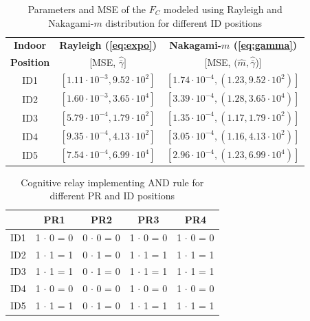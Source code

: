 \begin{table}
\renewcommand{\arraystretch}{1.3}
\caption{Parameters and MSE of the $F_{C}$ modeled using Rayleigh and Nakagami-$m$ distribution for different ID positions}
\label{tb:MSE_IO}
\centering
\begin{tabular}{c||c|c}
\hline
\bfseries Indoor & \bfseries Rayleigh (\ref{eq:expo}) & \bfseries Nakagami-$m$ (\ref{eq:gamma}) \\
\bfseries Position & [MSE, $\widehat{\bar{\gamma}}]$ & [MSE, $(\widehat{m}, \widehat{\bar{\gamma}}$)] \\
\hline\hline
ID1 & $[1.11 \cdot 10^{-3}, 9.52 \cdot 10^{2}]$  & $[1.74 \cdot 10^{-4} , (1.23, 9.52 \cdot 10^{2})] $ \\ \hline
ID2 & $[1.60 \cdot 10^{-3}, 3.65 \cdot 10^{4}]$  & $[3.39 \cdot 10^{-4} , (1.28, 3.65 \cdot 10^{4})] $ \\ \hline
ID3 & $[5.79 \cdot 10^{-4}, 1.79 \cdot 10^{2}]$  & $[1.35 \cdot 10^{-4} , (1.17, 1.79 \cdot 10^{2})] $ \\ \hline
ID4 & $[9.35 \cdot 10^{-4}, 4.13 \cdot 10^{2}]$  & $[3.05 \cdot 10^{-4} , (1.16, 4.13 \cdot 10^{2})] $ \\ \hline
ID5 & $[7.54 \cdot 10^{-4}, 6.99 \cdot 10^{4}]$  & $[2.96 \cdot 10^{-4} , (1.23, 6.99 \cdot 10^{4})] $ \\ \hline
\end{tabular}
\end{table}


\begin{table}[!h]
\renewcommand{\arraystretch}{1.3}
\caption{Cognitive relay implementing AND rule for different PR and ID positions}
\label{tb:BDecisions}
\centering
\begin{tabular}{c||c|c|c|c}
\hline
\bfseries & PR1 & PR2 & PR3 & PR4 \\
\hline\hline
ID1 & 1 $\cdot$ 0 = 0 & 0 $\cdot$ 0 = 0 & 1 $\cdot$ 0 = 0 & 1 $\cdot$ 0 = 0 \\ \hline
ID2 & 1 $\cdot$ 1 = 1 & 0 $\cdot$ 1 = 0 & 1 $\cdot$ 1 = 1 & 1 $\cdot$ 1 = 1 \\ \hline
ID3 & 1 $\cdot$ 1 = 1 & 0 $\cdot$ 1 = 0 & 1 $\cdot$ 1 = 1 & 1 $\cdot$ 1 = 1 \\ \hline
ID4 & 1 $\cdot$ 0 = 0 & 0 $\cdot$ 0 = 0 & 1 $\cdot$ 0 = 0 & 1 $\cdot$ 0 = 0 \\ \hline
ID5 & 1 $\cdot$ 1 = 1 & 0 $\cdot$ 1 = 0 & 1 $\cdot$ 1 = 1 & 1 $\cdot$ 1 = 1 \\ \hline
\end{tabular}
\end{table}




